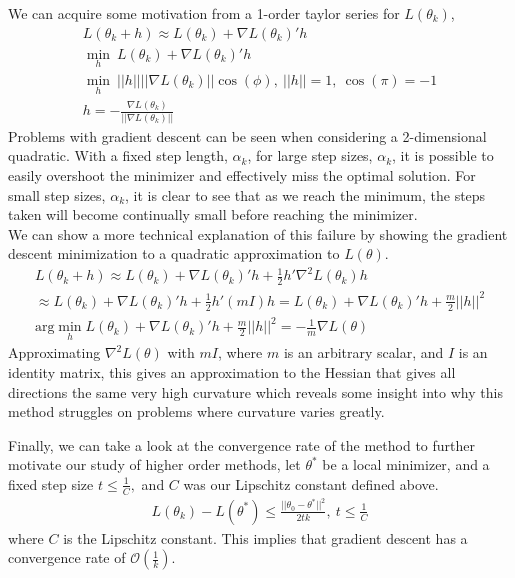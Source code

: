 \documentclass{article}
\begin{document}
We can acquire some motivation from a 1-order taylor series for $L(\theta_k)$,
\begin{gather*}
L(\theta_k + h) \approx L(\theta_k) + \nabla L(\theta_k)'h\\
\min_h\ L(\theta_k) + \nabla L(\theta_k)'h\\
\min_h\ ||h||||\nabla L(\theta_k)||\cos(\phi),\ ||h||=1,\ \cos(\pi) = -1\\
h = -\frac{\nabla L(\theta_k)}{||\nabla L(\theta_k)||}
\end{gather*}
Problems with gradient descent can be seen when considering a 2-dimensional quadratic. 
With a fixed step length, $\alpha_k$,
for large step sizes, $\alpha_k$, it is possible to easily overshoot the minimizer and effectively miss the optimal solution. For small step sizes, $\alpha_k$, it is clear to see that as we reach the minimum, the steps taken will become continually small before reaching the minimizer.\\


 We can show a more technical explanation of this failure by showing the gradient descent minimization to a quadratic approximation to $L(\theta)$.
\begin{gather*}
L(\theta_k + h) \approx L(\theta_k) + \nabla L(\theta_k)'h + \frac{1}{2}h'\nabla^2L(\theta_k)h\\
\approx L(\theta_k) + \nabla L(\theta_k)'h + \frac{1}{2}h'(mI)h = L(\theta_k) + \nabla L(\theta_k)'h + \frac{m}{2}||h||^2\\
\text{arg}\min_h L(\theta_k) + \nabla L(\theta_k)'h + \frac{m}{2}||h||^2 = -\frac{1}{m}\nabla L(\theta)
\end{gather*}
Approximating $\nabla^2L(\theta)$ with $mI$, where $m$ is an arbitrary scalar, and $I$ is an identity matrix, this gives an approximation to the Hessian that gives all directions the same very high curvature which reveals some insight into why this method struggles on problems where curvature varies greatly.

Finally, we can take a look at the convergence rate of the method to further motivate our study of higher order methods, let $\theta^*$ be a local minimizer, and a fixed step size $t \leq \frac{1}{C},$ and $C$ was our Lipschitz constant defined above.
\begin{gather*}
L(\theta_k) - L(\theta^*) \leq \frac{||\theta_0 - \theta^*||^2}{2tk},\ t \leq \frac{1}{C}
\end{gather*}
where $C$ is the Lipschitz constant. This implies that gradient descent has a convergence rate of $\mathcal{O}(\frac{1}{k})$.
\end{document}
